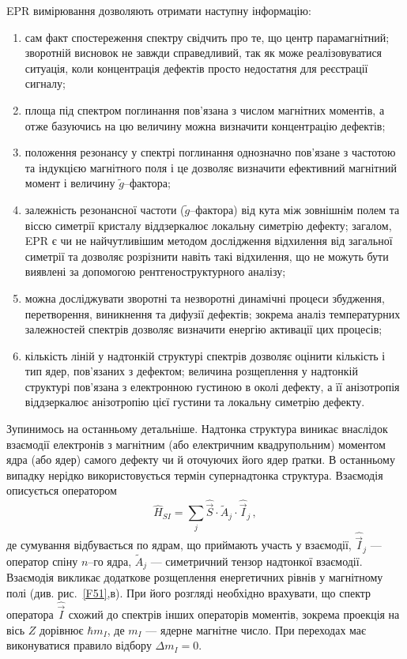 EPR вимірювання дозволяють отримати наступну інформацію:
\begin{enumerate}[label=\asbuk*),leftmargin=0em,itemindent=1.5em]
\item сам факт спостереження спектру свідчить про те, що центр парамагнітний;
 зворотній висновок не завжди справедливий, так як може реалізовуватися ситуація, коли концентрація
 дефектів просто недостатня для реєстрації сигналу;
\item площа під спектром поглинання пов'язана з числом магнітних моментів,
а отже базуючись на цю величину можна визначити концентрацію дефектів;
\item положення резонансу у спектрі поглинання однозначно пов'язане з частотою
та індукцією магнітного поля і це дозволяє визначити ефективний магнітний момент і
величину $\tilde{g}$--фактора;
\item залежність резонансної частоти ($\tilde{g}$--фактора) від кута між зовнішнім полем та віссю симетрії
кристалу віддзеркалює локальну симетрію дефекту;
загалом, EPR є чи не найчутливішим методом дослідження відхилення від загальної
симетрії та дозволяє розрізнити навіть такі відхилення, що
не можуть бути виявлені за допомогою рентгеноструктурного аналізу;
\item можна досліджувати
зворотні та незворотні динамічні процеси збудження,
перетворення, виникнення та дифузії дефектів;
зокрема аналіз температурних залежностей спектрів дозволяє
визначити енергію активації цих процесів;
\item кількість ліній у надтонкій структурі спектрів дозволяє
оцінити кількість і тип ядер, пов'язаних з дефектом;
величина розщеплення у надтонкій структурі пов'язана з електронною густиною
в околі дефекту, а її анізотропія віддзеркалює анізотропію цієї густини та локальну
симетрію дефекту.
\end{enumerate}

Зупинимось на останньому детальніше.
Надтонка структура виникає внаслідок взаємодії електронів
з магнітним (або електричним квадрупольним) моментом ядра (або ядер) самого
дефекту чи й  оточуючих його ядер ґратки.
В останньому випадку нерідко використовується термін супернадтонка структура.
Взаємодія описується оператором
\begin{equation}
\hat{H}_{SI}=\sum_j\hat{\vec{S}}\cdot\tilde{A}_j\cdot\hat{\vec{I}}_j\,,
\end{equation}
де сумування відбувається по ядрам, що приймають участь у взаємодії,
$\hat{\vec{I}}_j$ --- оператор спіну $n$--го ядра,
$\tilde{A}_j$ --- симетричний тензор надтонкої взаємодії.
Взаємодія викликає додаткове розщеплення енергетичних рівнів у магнітному полі
(див. рис.~\ref{F51},в).
При його розгляді необхідно врахувати, що
спектр оператора $\hat{\vec{I}}$ схожий до спектрів інших операторів моментів,
зокрема проекція на вісь $Z$ дорівнює $\hbar m_I$,
де $m_I$ --- ядерне магнітне число.
При переходах має виконуватися правило відбору $\Delta m_I=0$.


